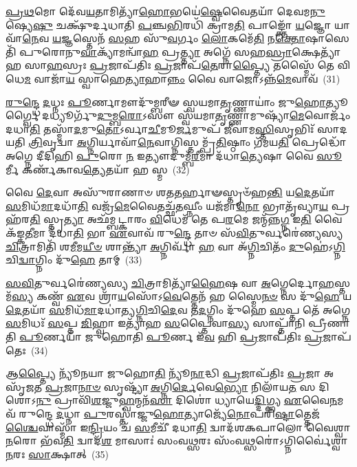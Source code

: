 \-\ul{𑌪𑍍𑌰}\-\-\ul{𑌥}\-𑌮𑍋 𑌦𑍇᳴𑌵\-\ul{𑌯}\-𑌤𑌾𑌮𑌿𑌤𑍍𑌯𑌾᳴\-\ul{𑌹𑍋}\-𑌭𑌯𑍇॑\-\ul{𑌷𑍍𑌵𑍇}\-𑌵𑍈𑌤𑌯𑌾᳴ 𑌦𑍇𑌵𑌮\-\ul{𑌨𑍁}\-𑌷𑍍𑌯𑍇\-\ul{𑌷𑍁} 𑌚𑌕𑍍𑌷𑍁᳴𑌰𑍍𑌦𑌧𑌾𑌤𑌿 \ul{𑌪}\-𑌞𑍍𑌚\-\ul{𑌭𑌿}\-𑌰𑌧𑌿᳴ 𑌕𑍍𑌰𑌾𑌮\-\ul{𑌤𑌿} 𑌪𑌾𑌙𑍍𑌕𑍍𑌤𑍋᳴ \ul{𑌯}\-𑌜𑍍𑌞𑍋 𑌯𑌾𑌵𑌾᳴\-\ul{𑌨𑍇}\-𑌵 \ul{𑌯}\-𑌜𑍍𑌞𑌸𑍍𑌤𑍇𑌨᳴ \ul{𑌸}\-𑌹 𑌸𑍁᳴\-\ul{𑌵}\-𑌰𑍍𑌗𑌂 \ul{𑌲𑍋}\-𑌕𑌮𑍇᳴\-\ul{𑌤𑌿} 𑌨\-\ul{𑌕𑍍𑌤𑍋}\-𑌷𑌾𑌸𑍇𑌤𑌿᳴ 𑌪𑍁𑌰𑍋𑌨𑍁\-\ul{𑌵𑌾}\-𑌕𑍍𑌯𑌾᳴𑌮𑌨𑍍𑌵𑌾᳴\-\ul{𑌹} 𑌪𑍍𑌰\-\ul{𑌤𑍍𑌤𑍍𑌯𑌾} 𑌅𑌗𑍍𑌨𑍇᳴ 𑌸𑌹\-\ul{𑌸𑍍𑌰𑌾}\-𑌕𑍍𑌷𑍇𑌤𑍍𑌯𑌾᳴𑌹 𑌸𑌾\-\ul{𑌹}\-𑌸𑍍𑌰𑌃 \ul{𑌪𑍍𑌰}\-𑌜𑌾𑌪᳴𑌤𑌿𑌃 \ul{𑌪𑍍𑌰}\-𑌜𑌾𑌪᳴\-\ul{𑌤𑍇}\-𑌰𑌾\-\ul{𑌪𑍍𑌤𑍍𑌯𑍈} 𑌤𑌸𑍍𑌮𑍈᳴ 𑌤𑍇 𑌵𑌿𑌧𑍇\-\ul{𑌮} 𑌵𑌾𑌜𑌾᳴\-\ul{𑌯} 𑌸𑍍𑌵𑌾𑌹𑍇\-\ul{𑌤𑍍𑌯𑌾}\-𑌹𑌾\-\ul{𑌨𑍍𑌨𑌂} 𑌵𑍈 𑌵𑌾𑌜𑍋\-𑌽𑌨𑍍𑌨᳴\-\ul{𑌮𑍇}\-𑌵𑌾𑌵᳴~(31)

\-\ul{𑌰𑍁}\-\-\ul{𑌨𑍍𑌦𑍍𑌧𑍇} \ul{𑌦}\-𑌧𑍍𑌨𑌃 \ul{𑌪𑍂}\-𑌰𑍍𑌣𑌾𑌮𑍗𑌦𑍁᳴𑌮𑍍𑌬𑌰𑍀𑍟 𑌸𑍍𑌵𑌯𑌮𑌾\-\ul{𑌤𑍃}\-𑌣𑍍𑌣𑌾𑌯𑌾𑌂॑ 𑌜𑍁\-\ul{𑌹𑍋}\-𑌤𑍍𑌯𑍂𑌰𑍍𑌗𑍍𑌵𑍈 𑌦𑌧𑍍𑌯𑍂𑌰𑍍𑌗𑍁᳴\-\ul{𑌦𑍁}\-𑌮𑍍𑌬\-\ul{𑌰𑍋}\-\-𑌽𑌸𑍗 𑌸𑍍𑌵᳴𑌯𑌮𑌾\-\ul{𑌤𑍃}\-𑌣𑍍𑌣𑌾𑌮𑍁𑌷𑍍𑌯𑌾᳴\-\ul{𑌮𑍇}\-𑌵𑍋𑌰𑍍𑌜𑌂᳴ 𑌦𑌧𑌾\-\ul{𑌤𑌿} 𑌤𑌸𑍍𑌮𑌾᳴\-\ul{𑌦}\-𑌮𑍁\-\ul{𑌤𑍋}\-\-𑌽𑌰𑍍𑌵𑌾\-\ul{𑌚𑍀}\-𑌮𑍂\-\ul{𑌰𑍍𑌜}\-𑌮𑍁𑌪᳴ 𑌜𑍀𑌵𑌾𑌮\-\ul{𑌸𑍍𑌤𑌿}\-𑌸𑍃𑌭𑌿𑌃᳴ 𑌸𑌾𑌦𑌯𑌤𑌿 \ul{𑌤𑍍𑌰𑌿}\-𑌵𑍃𑌦𑍍𑌵𑌾 \ul{𑌅}\-𑌗𑍍𑌨𑌿𑌰𑍍𑌯𑌾𑌵𑌾᳴\-\ul{𑌨𑍇}\-𑌵𑌾𑌗𑍍𑌨𑌿𑌸𑍍𑌤𑌮𑍍𑌪𑍍𑌰᳴\-\ul{𑌤𑌿}\-𑌷𑍍𑌠𑌾𑌂 𑌗᳴𑌮𑌯\-\ul{𑌤𑌿} 𑌪𑍍𑌰𑍇𑌦𑍍𑌧𑍋᳴ 𑌅𑌗𑍍𑌨𑍇 𑌦𑍀𑌦𑌿𑌹𑌿 \ul{𑌪𑍁}\-𑌰𑍋 \ul{𑌨} 𑌇𑌤𑍍𑌯𑍗𑌦𑍁𑌮𑍍𑌬᳴\-\ul{𑌰𑍀}\-𑌮𑌾 𑌦᳴𑌧𑌾\-\ul{𑌤𑍍𑌯𑍇}\-𑌷𑌾 𑌵𑍈 \ul{𑌸𑍂}\-𑌰𑍍𑌮𑍀 𑌕𑌰𑍍𑌣᳴𑌕𑌾𑌵\-\ul{𑌤𑍍𑌯𑍇}\-𑌤𑌯𑌾᳴ 𑌹 𑌸𑍍𑌮~(32)

𑌵𑍈 \ul{𑌦𑍇}\-𑌵𑌾 𑌅𑌸𑍁᳴𑌰𑌾𑌣𑌾𑍞 𑌶𑌤\-\ul{𑌤}\-𑌰𑍍\mbox{}𑌹𑌾𑍟𑌸𑍍𑌤𑍃𑍞᳴𑌹\-\ul{𑌨𑍍𑌤𑌿} 𑌯\-\ul{𑌦𑍇}\-𑌤𑌯𑌾᳴ \ul{𑌸}\-𑌮𑌿𑌧᳴\-\ul{𑌮𑌾}\-𑌦𑌧𑌾᳴\-\ul{𑌤𑌿} 𑌵𑌜𑍍𑌰᳴\-\ul{𑌮𑍇}\-𑌵𑍈𑌤𑌚𑍍𑌛᳴\-\ul{𑌤}\-𑌘𑍍𑌨𑍀𑌂 𑌯𑌜᳴𑌮𑌾\-\ul{𑌨𑍋} 𑌭𑍍𑌰𑌾𑌤𑍃᳴𑌵𑍍𑌯𑌾\-\ul{𑌯} 𑌪𑍍𑌰 𑌹᳴𑌰\-\ul{𑌤𑌿} 𑌸𑍍𑌤𑍃\-\ul{𑌤𑍍𑌯𑌾} 𑌅𑌛᳴𑌮𑍍𑌬𑌟𑍍𑌕𑌾𑌰𑌂 \ul{𑌵𑌿}\-𑌧𑍇𑌮᳴ 𑌤𑍇 𑌪\-\ul{𑌰}\-𑌮𑍇 𑌜𑌨𑍍𑌮᳴𑌨𑍍𑌨\-\ul{𑌗𑍍𑌨} 𑌇\-\ul{𑌤𑌿} 𑌵𑍈𑌕᳴𑌙𑍍𑌕\-\ul{𑌤𑍀}\-𑌮𑌾 𑌦᳴𑌧𑌾\-\ul{𑌤𑌿} 𑌭𑌾 \ul{𑌏}\-𑌵𑌾𑌵᳴ 𑌰𑍁\-\ul{𑌨𑍍𑌦𑍍𑌧𑍇} 𑌤𑌾𑍞 𑌸᳴\-\ul{𑌵𑌿}\-𑌤𑍁𑌰𑍍𑌵𑌰𑍇॑𑌣𑍍𑌯𑌸𑍍𑌯 \ul{𑌚𑌿}\-𑌤𑍍𑌰𑌾𑌮𑌿𑌤𑌿᳴ 𑌶\-\ul{𑌮𑍀}\-𑌮\-\ul{𑌯𑍀}\-\-\ul{𑍞} 𑌶𑌾𑌨𑍍𑌤𑍍𑌯𑌾᳴ \ul{𑌅}\-𑌗𑍍𑌨𑌿𑌰𑍍𑌵𑌾᳴ \ul{𑌹} 𑌵𑌾 𑌅᳴\-\ul{𑌗𑍍𑌨𑌿}\-𑌚𑌿𑌤𑌂᳴ \ul{𑌦𑍁}\-𑌹𑍇॑\-𑌽\-\ul{𑌗𑍍𑌨𑌿}\-𑌚𑌿\-\ul{𑌦𑍍𑌵𑌾}\-𑌗𑍍𑌨𑌿𑌂 𑌦𑍁᳴\-\ul{𑌹𑍇} 𑌤𑌾𑌮𑍍~(33)

\-\ul{𑌸}\-\-\ul{𑌵𑌿}\-𑌤𑍁𑌰𑍍𑌵𑌰𑍇॑𑌣𑍍𑌯𑌸𑍍𑌯 \ul{𑌚𑌿}\-𑌤𑍍𑌰𑌾𑌮𑌿𑌤𑍍𑌯𑌾᳴\-\ul{𑌹𑍈}\-𑌷 𑌵𑌾 \ul{𑌅}\-𑌗𑍍𑌨𑍇𑌰𑍍𑌦𑍋\-\ul{𑌹}\-𑌸𑍍𑌤𑌮᳴\-\ul{𑌸𑍍𑌯} 𑌕𑌣𑍍𑌵᳴ \ul{𑌏}\-𑌵 𑌶𑍍𑌰𑌾᳴\-\ul{𑌯}\-𑌸𑍋᳴\-𑌽\-\ul{𑌵𑍇}\-𑌤𑍍𑌤𑍇𑌨᳴ 𑌹 𑌸𑍍𑌮𑍈\-\ul{𑌨}\-\-\ul{𑍞} 𑌸 𑌦𑍁᳴\-\ul{𑌹𑍇} 𑌯\-\ul{𑌦𑍇}\-𑌤𑌯𑌾᳴ \ul{𑌸}\-𑌮𑌿𑌧᳴\-\ul{𑌮𑌾}\-𑌦𑌧𑌾॑𑌤𑍍𑌯\-\ul{𑌗𑍍𑌨𑌿}\-𑌚𑌿\-\ul{𑌦𑍇}\-𑌵 𑌤\-\ul{𑌦}\-𑌗𑍍𑌨𑌿𑌂 𑌦𑍁᳴𑌹𑍇 \ul{𑌸}\-𑌪𑍍𑌤 𑌤𑍇᳴ 𑌅𑌗𑍍𑌨𑍇 \ul{𑌸}\-𑌮𑌿𑌧𑌃᳴ \ul{𑌸}\-𑌪𑍍𑌤 \ul{𑌜𑌿}\-𑌹𑍍𑌵𑌾 𑌇𑌤𑍍𑌯𑌾᳴𑌹 \ul{𑌸}\-𑌪𑍍𑌤𑍈𑌵𑌾\-\ul{𑌸𑍍𑌯} 𑌸𑌾𑌪𑍍𑌤𑌾᳴𑌨𑌿 𑌪𑍍𑌰𑍀𑌣𑌾𑌤𑌿 \ul{𑌪𑍂}\-𑌰𑍍𑌣𑌯𑌾᳴ 𑌜𑍁𑌹𑍋𑌤𑌿 \ul{𑌪𑍂}\-𑌰𑍍𑌣 𑌇᳴\-\ul{𑌵} 𑌹𑌿 \ul{𑌪𑍍𑌰}\-𑌜𑌾𑌪᳴𑌤𑌿𑌃 \ul{𑌪𑍍𑌰}\-𑌜𑌾𑌪᳴𑌤𑍇𑌃~(34)

𑌆\-\ul{𑌪𑍍𑌤𑍍𑌯𑍈} 𑌨𑍍𑌯𑍂᳴𑌨𑌯𑌾 𑌜𑍁𑌹𑍋\-\ul{𑌤𑌿} 𑌨𑍍𑌯𑍂᳴\-\ul{𑌨𑌾}\-𑌦𑍍𑌧𑌿 \ul{𑌪𑍍𑌰}\-𑌜𑌾𑌪᳴𑌤𑌿𑌃 \ul{𑌪𑍍𑌰}\-𑌜𑌾 𑌅𑌸𑍃᳴𑌜𑌤 \ul{𑌪𑍍𑌰}\-𑌜𑌾\-\ul{𑌨𑌾}\-\-\ul{𑍞} 𑌸𑍃𑌷𑍍𑌟𑍍𑌯𑌾᳴ \ul{𑌅}\-𑌗𑍍𑌨𑌿\-\ul{𑌰𑍍𑌦𑍇}\-𑌵𑍇\-\ul{𑌭𑍍𑌯𑍋} 𑌨𑌿𑌲𑌾᳴𑌯\-\ul{𑌤} 𑌸 𑌦𑌿𑌶𑍋\-𑌽\-\ul{𑌨𑍁} 𑌪𑍍𑌰𑌾𑌵𑌿᳴\-\ul{𑌶}\-𑌜𑍍𑌜𑍁\-\ul{𑌹𑍍𑌵}\-𑌨𑍍𑌮𑌨᳴\-\ul{𑌸𑌾} 𑌦𑌿𑌶𑍋॑ 𑌧𑍍𑌯𑌾𑌯𑍇\-\ul{𑌦𑍍𑌦𑌿}\-𑌗𑍍𑌭𑍍𑌯 \ul{𑌏}\-𑌵𑍈\-\ul{𑌨}\-𑌮𑌵᳴ 𑌰𑍁𑌨𑍍𑌦𑍍𑌧𑍇 \ul{𑌦}\-𑌧𑍍𑌨𑌾 \ul{𑌪𑍁}\-𑌰𑌸𑍍𑌤𑌾॑𑌜𑍍𑌜𑍁\-\ul{𑌹𑍋}\-𑌤𑍍𑌯𑌾𑌜𑍍𑌯𑍇᳴\-\ul{𑌨𑍋}\-𑌪𑌰𑌿᳴\-\ul{𑌷𑍍𑌟𑌾}\-𑌤𑍍𑌤𑍇𑌜᳴\-\ul{𑌶𑍍𑌚𑍈}\-𑌵𑌾𑌸𑍍𑌮𑌾᳴ 𑌇\-\ul{𑌨𑍍𑌦𑍍𑌰𑌿}\-𑌯𑌂 𑌚᳴ \ul{𑌸}\-𑌮𑍀𑌚𑍀᳴ 𑌦𑌧𑌾\-\ul{𑌤𑌿} 𑌦𑍍𑌵𑌾𑌦᳴𑌶\-𑌕𑌪𑌾𑌲𑍋 𑌵𑍈𑌶𑍍𑌵𑌾\-\ul{𑌨}\-𑌰𑍋 𑌭᳴𑌵\-\ul{𑌤𑌿} 𑌦𑍍𑌵𑌾𑌦᳴\-\ul{𑌶} 𑌮𑌾𑌸𑌾𑌃॑ 𑌸𑌂𑌵\-\ul{𑌥𑍍𑌸}\-𑌰𑌃 𑌸𑌂᳴𑌵\-\ul{𑌥𑍍𑌸}\-𑌰𑍋॑\-𑌽𑌗𑍍𑌨𑌿𑌰𑍍𑌵𑍈॑𑌶𑍍𑌵𑌾\-\ul{𑌨}\-𑌰𑌃 \ul{𑌸𑌾}\-𑌕𑍍𑌷𑌾𑌤𑍍~(35)

